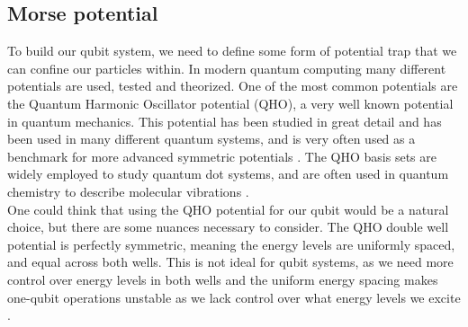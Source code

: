 \documentclass{subfiles}
\begin{document}
\subsection{Morse potential}\label{sec:morse_potential}
To build our qubit system, we need to define some form of potential trap that we can confine our particles within. In modern quantum computing many different potentials are used, tested and theorized. One of the most common potentials are the Quantum Harmonic Oscillator potential (QHO), a very well known potential in quantum mechanics. This potential has been studied in great detail and has been used in many different quantum systems, and is very often used as a benchmark for more advanced symmetric potentials \cite{griffiths2018introduction, berera2021quantum}. The QHO basis sets are widely employed to study quantum dot systems\cite{Yuan_2017}, and are often used in quantum chemistry to describe molecular vibrations \cite{atkins2011molecular}. 
\\ 

One could think that using the QHO potential for our qubit would be a natural choice, but there are some nuances necessary to consider. The QHO double well potential is perfectly symmetric, meaning the energy levels are uniformly spaced, and equal across both wells. This is not ideal for qubit systems, as we need more control over energy levels in both wells and the uniform energy spacing makes one-qubit operations unstable as we lack control over what energy levels we excite \cite{devoret2013superconducting}. 
\end{document}
